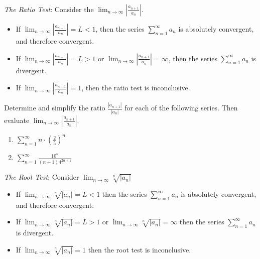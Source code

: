 \documentclass[12 pt]{article}
\begin{document}
\newpage

\textit{The Ratio Test}: Consider the $\displaystyle{ \lim_{n \to \infty} \left| \frac{a_{n+1}}{a_{n}} \right| }$. 
\begin{itemize}
\item If $\displaystyle{ \lim_{n \to \infty} \left| \frac{a_{n+1}}{a_{n}} \right| = L < 1}$, then the series $\displaystyle{\sum_{n=1}^{\infty} a_n}$ is absolutely convergent, and therefore convergent. 
\item If $\displaystyle{ \lim_{n \to \infty} \left| \frac{a_{n+1}}{a_{n}} \right| = L > 1}$ or $\displaystyle{ \lim_{n \to \infty} \left| \frac{a_{n+1}}{a_{n}} \right| = \infty}$, then the series $\displaystyle{\sum_{n=1}^{\infty} a_n}$ is divergent.
\item If $\displaystyle{ \lim_{n \to \infty} \left| \frac{a_{n+1}}{a_{n}} \right| = 1}$, then the ratio test is inconclusive. 
\end{itemize}

Determine and simplify the ratio $\frac{|a_{n+1}|}{|a_{n}|}$ for each of the following series. Then evaluate $\displaystyle{ \lim_{n \to \infty} \left| \frac{a_{n+1}}{a_{n}} \right| }$.

\begin{enumerate}

\item ${\displaystyle \sum_{n=1}^{\infty} n \cdot \left( \frac{2}{5} \right)^{n}}$


\item ${\displaystyle \sum_{n=1}^{\infty} \frac{10^n}{(n+1) 4^{2n+1} }}$


\end{enumerate}

\newpage

\textit{The Root Test}: Consider $\displaystyle{ \lim_{n \to \infty} \sqrt[n]{ \left| a_{n} \right| } }$ 
\begin{itemize}
\item If $\displaystyle{ \lim_{n \to \infty} \sqrt[n]{ \left| a_{n} \right| } = L < 1}$ then the series $\displaystyle{\sum_{n=1}^{\infty} a_n}$ is absolutely convergent, and therefore convergent. 
\item If $\displaystyle{ \lim_{n \to \infty} \sqrt[n]{ \left| a_{n} \right| } = L > 1}$ or $\displaystyle{ \lim_{n \to \infty} \sqrt[n]{ \left| a_{n} \right| } =\infty}$ then the series $\displaystyle{\sum_{n=1}^{\infty} a_n}$ is divergent. 
\item If $\displaystyle{ \lim_{n \to \infty} \sqrt[n]{ \left| a_{n} \right| } = 1}$ then the root test is inconclusive.
\end{itemize}
\end{document}
